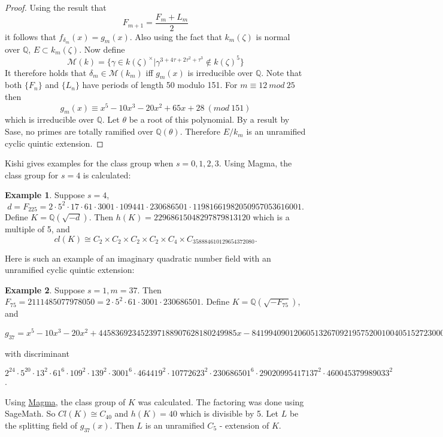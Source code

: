 \documentclass[12pt]{extarticle}
\newcommand{\Q}{\mathbb{Q}}
\newcommand{\<}{\langle}
\renewcommand{\>}{\rangle}
\theoremstyle{definition}
\newtheorem*{example}{Example}
\begin{document}
\begin{proof}
Using the result that \begin{equation}
    F_{m+1}= \frac{F_m + L_m}{2}
\end{equation}
it follows that $f_{\delta_m}(x) = g_m(x)$. Also using the fact that $k_m(\zeta)$ is normal over $\Q$, $E\subset k_m(\zeta)$. Now define  \begin{equation}
    \mathcal{M}(k)=\{\gamma \in k(\zeta)^{\times}|\gamma^{3+4\tau+2\tau^{2}+\tau^3}\notin k(\zeta)^5\}
\end{equation}
It therefore holds that $\delta_m \in \mathcal{M}(k_m)$ iff $g_m(x)$ is irreducible over $\Q$. Note that both $\{F_n\}$ and $\{L_n\}$ have periods of length 50 modulo 151. For $m\equiv12 \: mod \: 25$ then \begin{equation}
    g_m(x) \equiv x^5 - 10x^3 - 20x^2 + 65x + 28\:(mod \:151)
\end{equation} which is irreducible over $\Q$. Let $\theta$ be a root of this polynomial. By a result by Sase, no primes are totally ramified over $\Q(\theta)$. Therefore $E/k_m$ is an unramified cyclic quintic extension. 
\end{proof}
Kishi gives examples for the class group when $s = 0,1,2,3$. Using Magma, the class group for $s=4$ is calculated:
\begin{example}
Suppose $s=4$, 
\begin{equation}
d = F_{225} = 2 \cdot 5^2 \cdot 17 \cdot 61 \cdot 3001 \cdot 109441 \cdot  230686501 \cdot11981661982050957053616001.
\end{equation} Define $K = \Q(\sqrt{-d})$.
Then $h(K) = 22968615048297879813120$ which is a multiple of 5, and 
\begin{equation}
cl(K) \cong C_2 \times C_2 \times C_2 \times C_2 \times C_4 \times C_{358884610129654372080}.
\end{equation} 
\end{example}
Here is such an example of an imaginary quadratic number field with an unramified cyclic quintic extension:
\begin{example}
Suppose $s=1, m= 37$. Then $F_{75} = 2111485077978050 = 2 \cdot 5^2 \cdot 61 \cdot 3001 \cdot 230686501$. Define $K = \Q(\sqrt{-F_{75}})$, and 

\begin{center}
$g_{37} = x^5 - 10x^3 - 20x^2 + 445836923452397188907628180249985x  - 841994090120605132670921957520010040515272300004
$
\end{center}
with discriminant 

\begin{center}
$2^{24} \cdot 5^{20} \cdot 13^2 \cdot 61^6 \cdot 109^2 \cdot 139^2 \cdot 3001^6 \cdot 464419^2 \cdot 10772623^2 \cdot 230686501^6 \cdot 29020995417137^2 \cdot 460045379989033^2$. 
\end{center}

Using \href{http://magma.maths.usyd.edu.au/calc/}{Magma}, the class group of $K$ was calculated. The factoring was done using SageMath. So $Cl(K) \cong C_{40} $ and $h(K) = 40$ which is divisible by 5. Let $L$ be the splitting field of $g_{37}(x)$. Then $L$ is an unramified $C_5$ - extension of $K$. 
\end{example}
\end{document}

